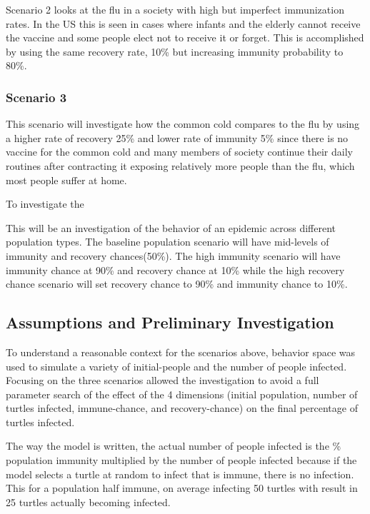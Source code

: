 \documentclass[11pt]{article} %
\begin{document}

Scenario 2 looks at the flu in a society with high but imperfect immunization rates. In the US this is seen in cases where infants and the elderly cannot receive the vaccine and some people elect not to receive it or forget. This is accomplished by using the same recovery rate, 10\% but increasing immunity probability to 80\%. 




\subsubsection{Scenario 3}

This scenario will investigate how the common cold compares to the flu by using a higher rate of recovery 25\% and lower rate of immunity 5\% since there is no vaccine for the common cold and many members of society continue their daily routines after contracting it exposing relatively more people than the flu, which most people suffer at home. 


To investigate the  


This will be an investigation of the behavior of an epidemic across different population types. The baseline population scenario will have mid-levels of immunity and recovery chances(50\%). The high immunity scenario will have immunity chance at 90\% and recovery chance at 10\% while the high recovery chance scenario will set recovery chance to 90\% and immunity chance to 10\%. 

\subsection{Assumptions and Preliminary Investigation}

To understand a reasonable context for the scenarios above, behavior space was used to simulate a variety of initial-people and the number of people infected. Focusing on the three scenarios allowed the investigation to avoid a full parameter search of the effect of the 4 dimensions (initial population, number of turtles infected, immune-chance, and recovery-chance) on the final percentage of turtles infected. 

The way the model is written, the actual number of people infected is the \% population immunity multiplied by the number of people infected because if the model selects a turtle at random to infect that is immune, there is no infection. This for a population half immune, on average infecting 50 turtles with result in 25 turtles actually becoming infected. 
\end{document}
